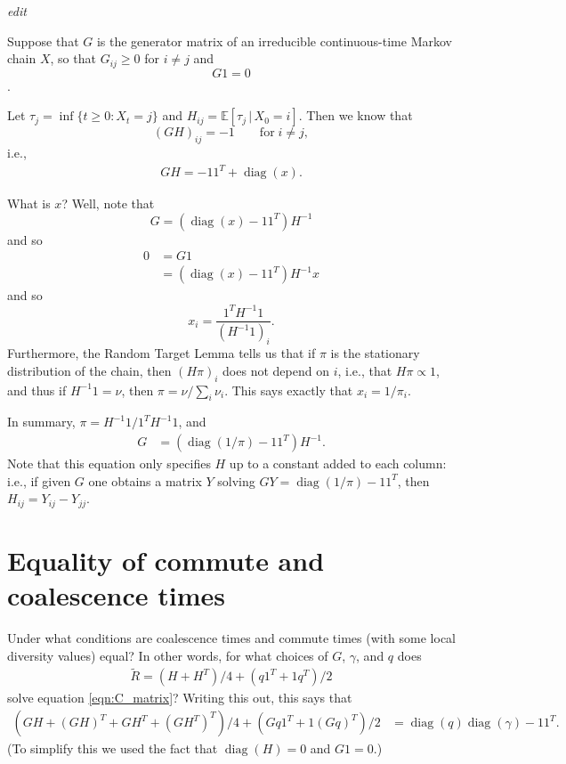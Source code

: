 \documentclass{article}
\newcommand{\comdist}{\widetilde{R}}
\DeclareMathOperator{\diag}{\mathop{\mbox{diag}}}
\newcommand{\E}{\mathbb{E}}
\newcommand{\plr}[1]{{\em \color{blue} #1}}
\begin{document}
\plr{edit}

Suppose that $G$ is the generator matrix of an irreducible continuous-time Markov chain $X$,
so that $G_{ij} \ge 0$ for $i \neq j$ and
$$ G 1 = 0 $$.

Let $\tau_{j} = \inf\{t \ge 0 : X_t = j\}$ and $H_{ij} = \E[\tau_j \,|\, X_0 = i]$.
Then we know that
$$
    (G H)_{ij} = -1 \qquad \text{for} \; i \neq j ,
$$
i.e.,
\begin{align} \label{eqn:GH}
    GH = - 1 1^T + \diag(x).
\end{align}

What is $x$?  Well, note that
$$
    G = (\diag(x) - 1 1^T) H^{-1}
$$
and so
$$ \begin{aligned}
    0 &= G1 \\
    &= (\diag(x) - 1 1^T) H^{-1} x 
\end{aligned} $$
and so
$$
    x_i = \frac{ 1^T H^{-1} 1 }{ (H^{-1} 1)_i } .
$$
Furthermore,
the Random Target Lemma \citep{aldous} %
tells us that if $\pi$ is the stationary distribution of the chain, then 
$(H \pi)_i$ does not depend on $i$,
i.e., that $H \pi \propto 1$,
and thus if $H^{-1} 1 = \nu$, 
then $\pi = \nu / \sum_i \nu_i$.
This says exactly that $x_i = 1/\pi_i$.

In summary, $\pi = H^{-1} 1 / 1^T H^{-1} 1$, and 
\begin{align}
    G 
    &= (\diag(1/\pi) - 1 1^T) H^{-1} .
\end{align}
Note that this equation only specifies $H$ up to a constant added to each column:
i.e., if given $G$ one obtains a matrix $Y$ solving $GY = \diag(1/\pi) - 1 1^T$,
then $H_{ij} = Y_{ij} - Y_{jj}$.


\section{Equality of commute and coalescence times}
\label{sec:com_eq_coal}

Under what conditions are coalescence times and commute times (with some local diversity values) equal?
In other words, for what choices of $G$, $\gamma$, and $q$ does
\begin{align}
    \comdist = (H + H^T)/4 + (q 1^T + 1 q^T)/2
\end{align}
solve equation \eqref{eqn:C_matrix}?
Writing this out, this says that
\begin{align} \label{eqn:R_coal}
    ( GH + (GH)^T + GH^T + (GH^T)^T )/4 + (Gq 1^T + 1 (Gq)^T)/2
    &=
    \diag(q) \diag(\gamma) - 1 1^T .
\end{align}
(To simplify this we used the fact that $\diag(H) = 0$ and $G1 = 0$.)
\end{document}
